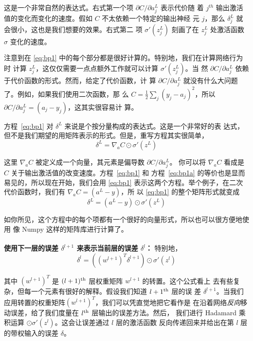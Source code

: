 这是一个非常自然的表达式。右式第一个项 $\partial C/\partial a_j^L$ 表示代价随
着 $j^{th}$ 输出激活值的变化而变化的速度。假如 $C$ 不太依赖一个特定的输出神经
元 $j$，那么 $\delta_j^L$ 就会很小，这也是我们想要的效果。右式第二
项 $\sigma'(z_j^L)$ 刻画了在 $z_j^L$ 处激活函数 $\sigma$ 变化的速度。

注意到在 \eqref{eq:bp1} 中的每个部分都是很好计算的。特别地，我们在计算网络行为时
计算 $z_j^L$，这仅仅需要一点点额外工作就可以计算 $\sigma'(z_j^L)$。当
然 $\partial C/\partial a_j^L$ 依赖于代价函数的形式。然而，给定了代价函数，计
算 $\partial C/\partial a_j^L$ 就没有什么大问题了。例如，如果我们使用二次函数，那
么 $C = \frac{1}{2}
\sum_j(y_j-a_j)^2$，所以$\partial C/\partial a_j^L = (a_j - y_j)$，这其实很容易计
算。

方程~\eqref{eq:bp1} 对 $\delta^L$ 来说是个按分量构成的表达式。这是一个非常好的表
达式，但不是我们期望的用矩阵表示的形式。但是，重写方程其实很简单，
\begin{equation} 
  \delta^L = \nabla_a C \odot \sigma'(z^L)
  \label{eq:bp1a}\tag{BP1a}
\end{equation}

这里 $\nabla_a C$ 被定义成一个向量，其元素是偏导数 $\partial C/\partial a_j^L$。
你可以将 $\nabla_a C$ 看成是 $C$ 关于输出激活值的改变速度。方程~\eqref{eq:bp1} 和
方程~\eqref{eq:bp1a} 的等价也是显而易见的，所以现在开始，我们会用 \eqref{eq:bp1}
表示这两个方程。举个例子，在二次代价函数时，我们有 $\nabla_a C = (a^L - y)$，所
以 \eqref{eq:bp1} 的整个矩阵形式就变成
\begin{equation} 
  \delta^L = (a^L-y) \odot \sigma'(z^L)
  \label{eq:30}\tag{30}
\end{equation}

如你所见，这个方程中的每个项都有一个很好的向量形式，所以也可以很方便地使用
像 Numpy 这样的矩阵库进行计算了。
\\
\\
\textbf{使用下一层的误差 $\delta^{l+1}$ 来表示当前层的误差 $\delta^l$：} 特别地，
\begin{equation}
  \delta^l = ((w^{l+1})^T \delta^{l+1}) \odot \sigma'(z^l)
  \label{eq:bp2}\tag{BP2}
\end{equation}

其中 $(w^{l+1})^T$ 是 $(l+1)^{\rm th}$ 层权重矩阵 $w^{l+1}$ 的转置。这个公式看上
去有些复杂，但每一个元素有很好的解释。假设我们知道 $l+1^{\rm th}$ 层的误
差
$\delta^{l+1}$。当我们应用转置的权重矩阵$(w^{l+1})^T$，我们可以凭直觉地把它看作是
在沿着网络\emph{反向}移动误差，给了我们度量在 $l^{\rm th}$ 层输出的误差方法。然后，
我们进行 Hadamard 乘积运算 $\odot \sigma'(z^l)$。这会让误差通过 $l$ 层的激活函数
反向传递回来并给出在第 $l$ 层的带权输入的误差 $\delta$。


